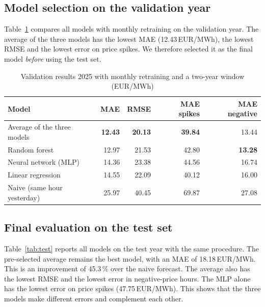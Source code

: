 \documentclass[12pt,oneside]{article}
\begin{document}
\subsection{Model selection on the validation year}

Table~\ref{tab:valroll} compares all models with monthly retraining on the validation year. The average of the three models has the lowest MAE (12.43\,EUR/MWh), the lowest RMSE and the lowest error on price spikes. We therefore selected it as the final model \emph{before} using the test set.

\begin{table}[!htbp]
    \centering
    \caption{Validation results 2025 with monthly retraining and a two-year window (EUR/MWh)}
    \begin{tabular}{lrrrr}
        \toprule
        Model & MAE & RMSE & MAE spikes & MAE negative \\
        \midrule
        Average of the three models & \textbf{12.43} & \textbf{20.13} & \textbf{39.84} & 13.44 \\
        Random forest & 12.97 & 21.53 & 42.80 & \textbf{13.28} \\
        Neural network (MLP) & 14.36 & 23.38 & 44.56 & 16.74 \\
        Linear regression & 14.55 & 22.09 & 40.12 & 16.00 \\
        Naive (same hour yesterday) & 25.97 & 40.45 & 69.87 & 27.08 \\
        \bottomrule
    \end{tabular}
    \label{tab:valroll}
\end{table}

\subsection{Final evaluation on the test set}

Table~\ref{tab:test} reports all models on the test year with the same procedure. The pre-selected average remains the best model, with an MAE of 18.18\,EUR/MWh. This is an improvement of 45.3\,\% over the naive forecast. The average also has the lowest RMSE and the lowest error in negative-price hours. The MLP alone has the lowest error on price spikes (47.75\,EUR/MWh). This shows that the three models make different errors and complement each other.
\end{document}

